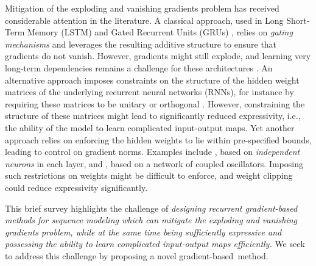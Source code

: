 \documentclass{article} \usepackage{iclr2022_conference,times}
\begin{document}
Mitigation of the exploding and vanishing gradients problem has received considerable attention in the literature. 
A classical approach, used in Long Short-Term Memory (LSTM) \citep{lstm} and Gated Recurrent Units (GRUs) \citep{gru}, relies on \emph{gating mechanisms} and leverages the resulting additive structure to ensure that gradients do not vanish. 
However, gradients might still explode, and learning very long-term dependencies remains a challenge for these architectures \citep{indrnn}. 
An alternative approach imposes constraints on the structure of the hidden weight matrices of the underlying recurrent neural networks (RNNs), for instance by requiring these matrices to be unitary or orthogonal \citep{orthornn,urnn,eurnn,nnRNN}. However, constraining the structure of these matrices might lead to significantly reduced expressivity, i.e., the ability of the model to learn complicated input-output maps. 
Yet another approach relies on enforcing the hidden weights to lie within pre-specified bounds, leading to control on gradient norms. 
Examples include \citet{indrnn}, based on \emph{independent neurons} in each layer, and \citet{coRNN}, based on a network of coupled oscillators. 
Imposing such restrictions on weights might be difficult to enforce, and weight clipping could reduce expressivity significantly. 

This brief survey highlights the challenge of \emph{designing recurrent gradient-based methods for sequence modeling which can mitigate the exploding and vanishing gradients problem, while at the same time being sufficiently expressive and possessing the ability to learn complicated input-output maps efficiently.} 
We seek to address this challenge by proposing a novel gradient-based~method. 
\end{document}
